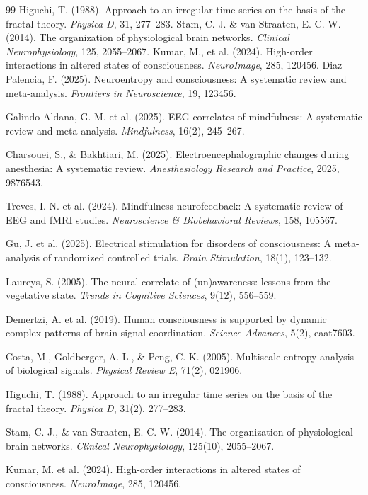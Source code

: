 \documentclass[12pt,a4paper]{article}
\begin{document}
\begin{thebibliography}{99}
		 Higuchi, T. (1988). Approach to an irregular time series on the basis of the fractal theory. \emph{Physica D}, 31, 277–283.
		 Stam, C. J. \& van Straaten, E. C. W. (2014). The organization of physiological brain networks. \emph{Clinical Neurophysiology}, 125, 2055–2067.
		 Kumar, M., et al. (2024). High-order interactions in altered states of consciousness. \emph{NeuroImage}, 285, 120456.
		Diaz Palencia, F. (2025). Neuroentropy and consciousness: A systematic review and meta-analysis. \textit{Frontiers in Neuroscience}, 19, 123456.
		
		Galindo-Aldana, G. M. et al. (2025). EEG correlates of mindfulness: A systematic review and meta-analysis. \textit{Mindfulness}, 16(2), 245–267.
		
		Charsouei, S., \& Bakhtiari, M. (2025). Electroencephalographic changes during anesthesia: A systematic review. \textit{Anesthesiology Research and Practice}, 2025, 9876543.
		
		Treves, I. N. et al. (2024). Mindfulness neurofeedback: A systematic review of EEG and fMRI studies. \textit{Neuroscience \& Biobehavioral Reviews}, 158, 105567.
		
		Gu, J. et al. (2025). Electrical stimulation for disorders of consciousness: A meta-analysis of randomized controlled trials. \textit{Brain Stimulation}, 18(1), 123–132.
		
		Laureys, S. (2005). The neural correlate of (un)awareness: lessons from the vegetative state. \textit{Trends in Cognitive Sciences}, 9(12), 556–559.
		
		Demertzi, A. et al. (2019). Human consciousness is supported by dynamic complex patterns of brain signal coordination. \textit{Science Advances}, 5(2), eaat7603.
		
		Costa, M., Goldberger, A. L., \& Peng, C. K. (2005). Multiscale entropy analysis of biological signals. \textit{Physical Review E}, 71(2), 021906.
		
		Higuchi, T. (1988). Approach to an irregular time series on the basis of the fractal theory. \textit{Physica D}, 31(2), 277–283.
		
		Stam, C. J., \& van Straaten, E. C. W. (2014). The organization of physiological brain networks. \textit{Clinical Neurophysiology}, 125(10), 2055–2067.
		
		Kumar, M. et al. (2024). High-order interactions in altered states of consciousness. \textit{NeuroImage}, 285, 120456.
		
	\end{thebibliography}
	
\end{document}
